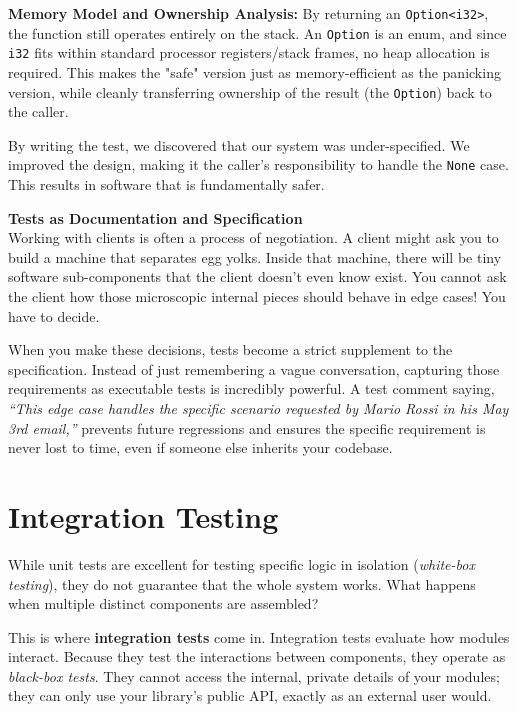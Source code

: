 \textbf{Memory Model and Ownership Analysis:} By returning an \texttt{Option<i32>}, the function still operates entirely on the stack. An \texttt{Option} is an enum, and since \texttt{i32} fits within standard processor registers/stack frames, no heap allocation is required. This makes the "safe" version just as memory-efficient as the panicking version, while cleanly transferring ownership of the result (the \texttt{Option}) back to the caller.

By writing the test, we discovered that our system was under-specified. We improved the design, making it the caller's responsibility to handle the \texttt{None} case. This results in software that is fundamentally safer.

\begin{insightbox}
\textbf{Tests as Documentation and Specification}\\
Working with clients is often a process of negotiation. A client might ask you to build a machine that separates egg yolks. Inside that machine, there will be tiny software sub-components that the client doesn't even know exist. You cannot ask the client how those microscopic internal pieces should behave in edge cases! You have to decide.

When you make these decisions, tests become a strict supplement to the specification. Instead of just remembering a vague conversation, capturing those requirements as executable tests is incredibly powerful. A test comment saying, \textit{``This edge case handles the specific scenario requested by Mario Rossi in his May 3rd email,''} prevents future regressions and ensures the specific requirement is never lost to time, even if someone else inherits your codebase.
\end{insightbox}

\section{Integration Testing}

While unit tests are excellent for testing specific logic in isolation (\textit{white-box testing}), they do not guarantee that the whole system works. What happens when multiple distinct components are assembled? 

This is where \textbf{integration tests} come in. Integration tests evaluate how modules interact. Because they test the interactions between components, they operate as \textit{black-box tests}. They cannot access the internal, private details of your modules; they can only use your library's public API, exactly as an external user would. 

